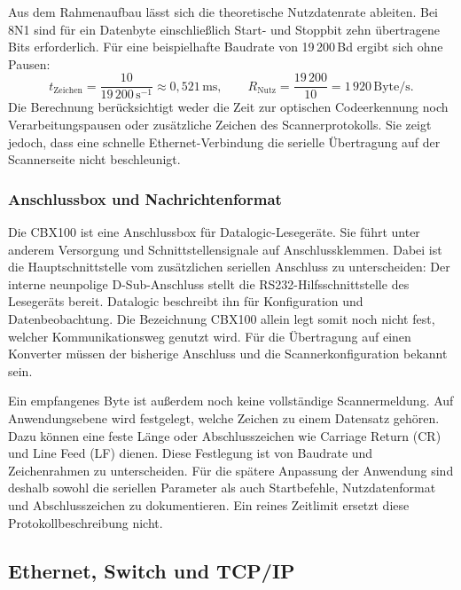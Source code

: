 Aus dem Rahmenaufbau lässt sich die theoretische Nutzdatenrate ableiten. Bei 8N1 sind für ein Datenbyte einschließlich Start- und Stoppbit zehn übertragene Bits erforderlich. Für eine beispielhafte Baudrate von 19\,200\,Bd ergibt sich ohne Pausen:
\begin{equation}
  t_{\mathrm{Zeichen}} = \frac{10}{19\,200\,\mathrm{s}^{-1}}
  \approx 0{,}521\,\mathrm{ms},
  \qquad
  R_{\mathrm{Nutz}} = \frac{19\,200}{10}
  = 1\,920\,\mathrm{Byte/s}.
  \label{eq:rs232_nutzdaten}
\end{equation}
Die Berechnung berücksichtigt weder die Zeit zur optischen Codeerkennung noch Verarbeitungspausen oder zusätzliche Zeichen des Scannerprotokolls. Sie zeigt jedoch, dass eine schnelle Ethernet-Verbindung die serielle Übertragung auf der Scannerseite nicht beschleunigt.

\subsubsection{Anschlussbox und Nachrichtenformat}

Die CBX100 ist eine Anschlussbox für Datalogic-Lesegeräte. Sie führt unter anderem Versorgung und Schnittstellensignale auf Anschlussklemmen. Dabei ist die Hauptschnittstelle vom zusätzlichen seriellen Anschluss zu unterscheiden: Der interne neunpolige D-Sub-Anschluss stellt die RS232-Hilfsschnittstelle des Lesegeräts bereit. Datalogic beschreibt ihn für Konfiguration und Datenbeobachtung. Die Bezeichnung CBX100 allein legt somit noch nicht fest, welcher Kommunikationsweg genutzt wird. Für die Übertragung auf einen Konverter müssen der bisherige Anschluss und die Scannerkonfiguration bekannt sein. \cite{datalogic_cbx100_grundlagen}

Ein empfangenes Byte ist außerdem noch keine vollständige Scannermeldung. Auf Anwendungsebene wird festgelegt, welche Zeichen zu einem Datensatz gehören. Dazu können eine feste Länge oder Abschlusszeichen wie Carriage Return (CR) und Line Feed (LF) dienen. \cite{python_socket_howto} Diese Festlegung ist von Baudrate und Zeichenrahmen zu unterscheiden. Für die spätere Anpassung der Anwendung sind deshalb sowohl die seriellen Parameter als auch Startbefehle, Nutzdatenformat und Abschlusszeichen zu dokumentieren. Ein reines Zeitlimit ersetzt diese Protokollbeschreibung nicht.

\subsection{Ethernet, Switch und TCP/IP}
\label{sec:grundlagen_ethernet}

